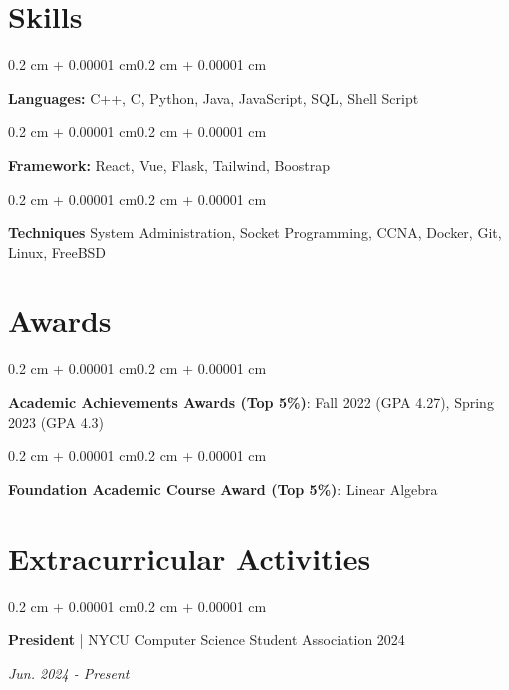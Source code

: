 \documentclass[10pt, letterpaper]{article}
\newenvironment{highlights}{
    \begin{itemize}[
        topsep=0.10 cm,
        parsep=0.10 cm,
        partopsep=0pt,
        itemsep=0pt,
        leftmargin=0.4 cm + 10pt
    ]
}{
    \end{itemize}
}
\newenvironment{onecolentry}{
    \begin{adjustwidth}{0.2 cm + 0.00001 cm}{0.2 cm + 0.00001 cm}
}{
    \end{adjustwidth}
}
\newenvironment{twocolentry}[2][]{
    \onecolentry
    \def\secondColumn{#2}
    \setcolumnwidth{\fill, 4.5 cm}
    \begin{paracol}{2}
}{
    \switchcolumn \raggedleft \secondColumn
    \end{paracol}
    \endonecolentry
}
\begin{document}
    \section{Skills}
        \begin{onecolentry}
            \textbf{Languages:} C++, C, Python, Java, JavaScript, SQL, Shell Script
        \end{onecolentry}
        
        \vspace{0.15 cm}
        \begin{onecolentry}
            \textbf{Framework:} React, Vue, Flask, Tailwind, Boostrap
        \end{onecolentry}
        
        \vspace{0.15 cm}
        \begin{onecolentry}
            \textbf{Techniques} System Administration, Socket Programming, CCNA, Docker, Git, Linux, FreeBSD
        \end{onecolentry}

    \section{Awards}
        \begin{onecolentry}
            \textbf{Academic Achievements Awards (Top 5\%)}: Fall 2022 (GPA 4.27), Spring 2023 (GPA 4.3)
        \end{onecolentry}
        
        \vspace{0.15 cm}
        \begin{onecolentry}
            \textbf{Foundation Academic Course Award (Top 5\%)}: Linear Algebra
        \end{onecolentry}

    \section{Extracurricular Activities}

        \begin{twocolentry}{\textit{Jun. 2024 - Present}}
                \textbf{President} | NYCU Computer Science Student Association 2024
        \end{twocolentry}
        
\end{document}
